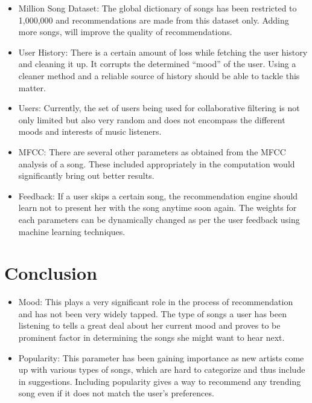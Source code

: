  \begin{itemize}
 	\item Million Song Dataset: The global dictionary of songs has been restricted to 1,000,000 and recommendations are made from this dataset only. Adding more songs, will improve the quality of recommendations.
 	\item User History: There is a certain amount of loss while fetching the user history and cleaning it up. It corrupts the determined ``mood'' of the user. Using a cleaner method and a reliable source of history should be able to tackle this matter.
 	\item Users: Currently, the set of users being used for collaborative filtering is not only limited but also very random and does not encompass the different moods and interests of music listeners.
 	\item MFCC: There are several other parameters as obtained from the MFCC analysis of a song. These included appropriately in the computation would significantly bring out better results.
 	\item Feedback: If a user skips a certain song, the recommendation engine should learn not to present her with the song anytime soon again. The weights for each parameters can be dynamically changed as per the user feedback using machine learning techniques.
 \end{itemize} 
	
	\section{Conclusion}
\begin{itemize}
	\item Mood: This plays a very significant role in the process of recommendation and has not been very widely tapped. The type of songs a user has been listening to tells a great deal about her current mood and proves to be prominent factor in determining the songs she might want to hear next.
	\item Popularity: This parameter has been gaining importance as new artists come up with various types of songs, which are hard to categorize and thus include in suggestions. Including popularity gives a way to recommend any trending song even if it does not match the user's preferences.
\end{itemize}